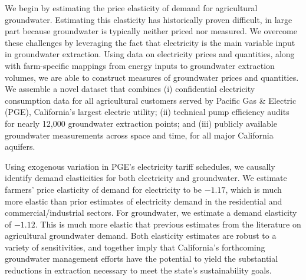 We begin by estimating the price elasticity of demand for agricultural groundwater. %
Estimating this elasticity has historically proven difficult, in large  part because groundwater is typically neither priced nor measured. 
We overcome these challenges by leveraging the fact that electricity is the main variable input in groundwater extraction. Using data on electricity prices and quantities, along with farm-specific mappings from energy inputs to groundwater extraction volumes, we are able to construct measures of groundwater prices and quantities. We assemble a novel dataset that combines (i) confidential electricity consumption data for all agricultural customers served by Pacific Gas \& Electric (PGE), California's largest electric utility; (ii) technical pump efficiency audits for nearly 12,000 groundwater extraction points; and (iii) publicly available groundwater measurements across space and time, for all major California aquifers.%

Using exogenous variation in PGE's electricity tariff schedules, we causally identify demand elasticities for both electricity and groundwater. We estimate farmers' price elasticity of demand for electricity to be $-1.17$, which is much more elastic than prior estimates of electricity demand in the residential and commercial/industrial sectors. For groundwater, we estimate a demand elasticity of $-1.12$. This is much more elastic that previous estimates from the literature on agricultural groundwater demand. Both elasticity estimates are robust to a variety of sensitivities, and together imply that California's forthcoming groundwater management efforts have the potential to yield the substantial reductions in extraction necessary to meet the state's sustainability goals.


